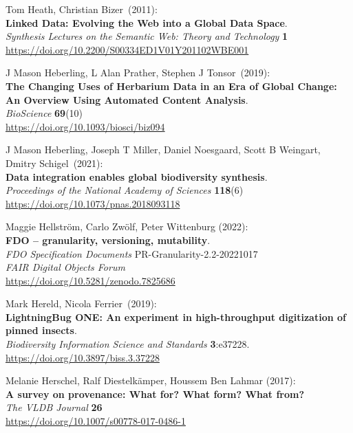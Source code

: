 \begin{thebibliography}{9}
Tom Heath, Christian Bizer~(2011):\\
\textbf{Linked Data: Evolving the Web into a Global Data Space}.\\
\emph{Synthesis Lectures on the Semantic Web: Theory and Technology} \textbf{1}\\
\url{https://doi.org/10.2200/S00334ED1V01Y201102WBE001}

J Mason Heberling, L Alan Prather, Stephen J Tonsor~(2019):\\
\textbf{The Changing Uses of Herbarium Data in an Era of Global Change: An Overview
Using Automated Content Analysis}.\\
\emph{BioScience} \textbf{69}(10)\\
\url{https://doi.org/10.1093/biosci/biz094}

J Mason Heberling, Joseph T Miller, Daniel Noesgaard, Scott B Weingart, Dmitry Schigel~(2021):\\
\textbf{Data integration enables global biodiversity
synthesis}.\\
\emph{Proceedings of the National Academy of Sciences} \textbf{118}(6)\\
\url{https://doi.org/10.1073/pnas.2018093118}

Maggie Hellström, Carlo Zwölf, Peter Wittenburg (2022): \\
\textbf{FDO -- granularity, versioning, mutability}. \\
\emph{FDO Specification Documents} PR-Granularity-2.2-20221017\\
\emph{FAIR Digital Objects Forum}\\
\url{https://doi.org/10.5281/zenodo.7825686}

Mark Hereld, Nicola Ferrier~(2019):\\
\textbf{LightningBug ONE: An experiment in high-throughput digitization of pinned insects}.\\
\emph{Biodiversity Information Science and Standards} \textbf{3}:e37228.\\
\url{https://doi.org/10.3897/biss.3.37228}

Melanie Herschel, Ralf Diestelkämper, Houssem Ben Lahmar (2017):\\
\textbf{A survey on provenance: What for? What form? What from?}\\
\emph{The VLDB Journal} \textbf{26}\\
\url{https://doi.org/10.1007/s00778-017-0486-1}


\end{thebibliography}
